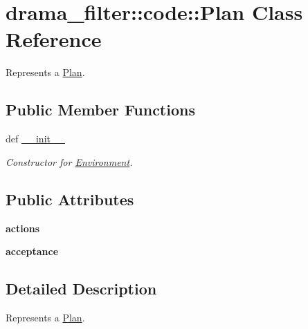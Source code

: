 \hypertarget{classdrama__filter_1_1code_1_1Plan}{
\section{drama\_\-filter::code::Plan Class Reference}
\label{classdrama__filter_1_1code_1_1Plan}
}


Represents a \hyperlink{classdrama__filter_1_1code_1_1Plan}{Plan}.  


\subsection*{Public Member Functions}
\begin{DoxyCompactItemize}
\item 
def \hyperlink{classdrama__filter_1_1code_1_1Plan_a75c93114cd2b6072b6f263629202b2c9}{\_\-\_\-init\_\-\_\-}
\begin{DoxyCompactList}\small\item\em Constructor for \hyperlink{classdrama__filter_1_1code_1_1Environment}{Environment}. \end{DoxyCompactList}\end{DoxyCompactItemize}
\subsection*{Public Attributes}
\begin{DoxyCompactItemize}
\item 
\hypertarget{classdrama__filter_1_1code_1_1Plan_ac96f0f0d36406e5b4956b6fb82a5ce5a}{
{\bfseries actions}}
\label{classdrama__filter_1_1code_1_1Plan_ac96f0f0d36406e5b4956b6fb82a5ce5a}

\item 
\hypertarget{classdrama__filter_1_1code_1_1Plan_aa22ecdf4c88cc561eb1995f5e35d55cd}{
{\bfseries acceptance}}
\label{classdrama__filter_1_1code_1_1Plan_aa22ecdf4c88cc561eb1995f5e35d55cd}

\end{DoxyCompactItemize}


\subsection{Detailed Description}
Represents a \hyperlink{classdrama__filter_1_1code_1_1Plan}{Plan}. 

